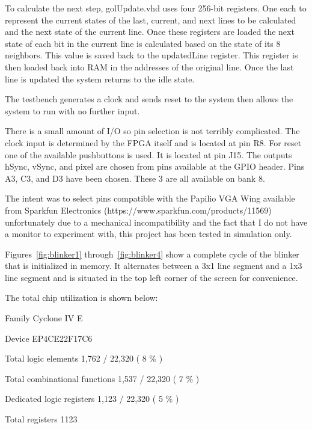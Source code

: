 \documentclass[twoside, letterpaper]{report}
\begin{document}
To calculate the next step, golUpdate.vhd uses four 256-bit registers. One each to represent the current states of the last, current, and next lines to be calculated and the next state of the current line. Once these registers are loaded the next state of each bit in the current line is calculated based on the state of its 8 neighbors. This value is saved back to the updatedLine register. This register is then loaded back into RAM in the addresses of the original line. Once the last line is updated the system returns to the idle state.
\newline
\par
The testbench generates a clock and sends reset to the system then allows the system to run with no further input.
\newline
\par
There is a small amount of I/O so pin selection is not terribly complicated. The clock input is determined by the FPGA itself and is located at pin R8. For reset one of the available pushbuttons is used. It is located at pin J15. The outputs hSync, vSync, and pixel are chosen from pins available at the GPIO header. Pins A3, C3, and D3 have been chosen. These 3 are all available on bank 8.

The intent was to select pins compatible with the Papilio VGA Wing available from Sparkfun Electronics (https://www.sparkfun.com/products/11569) unfortunately due to a mechanical incompatibility and the fact that I do not have a monitor to experiment with, this project has been tested in simulation only.
\newline
\par
Figures~\ref{fig:blinker1} through~\ref{fig:blinker4} show a complete cycle of the blinker that is initialized in memory. It alternates between a 3x1 line segment and a 1x3 line segment and is situated in the top left corner of the screen for convenience.
\newline
\par
The total chip utilization is shown below:
\newline
\par
Family	Cyclone IV E

Device	EP4CE22F17C6

Total logic elements	1,762 / 22,320 ( 8 \% )

Total combinational functions	1,537 / 22,320 ( 7 \% )

Dedicated logic registers	1,123 / 22,320 ( 5 \% )

Total registers	1123
\end{document}
